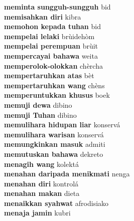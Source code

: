 \textbf{ meminta sungguh-sungguh  } bid \\
\textbf{ memisahkan diri  } kibra \\
\textbf{ memohon kepada tuhan  } bid \\
\textbf{ mempelai lelaki  } brùidehòm \\
\textbf{ mempelai perempuan  } brùit \\
\textbf{ mempercayai bahawa  } weita \\
\textbf{ memperolok-olokkan  } chèrcha \\
\textbf{ mempertaruhkan atas  } bèt \\
\textbf{ mempertaruhkan wang  } chèns \\
\textbf{ memperuntukkan khusus  } boek \\
\textbf{ memuji dewa  } dibino \\
\textbf{ memuji Tuhan  } dibino \\
\textbf{ memulihara hidupan liar  } konservá \\
\textbf{ memulihara warisan  } konservá \\
\textbf{ memungkinkan masuk  } admiti \\
\textbf{ memutuskan bahawa  } dekreto \\
\textbf{ menagih wang  } kolektá \\
\textbf{ menahan daripada menikmati  } nenga \\
\textbf{ menahan diri  } kontrolá \\
\textbf{ menahan makan  } dieta \\
\textbf{ menaikkan syahwat  } afrodisiako \\
\textbf{ menaja jamin  } kubri \\
